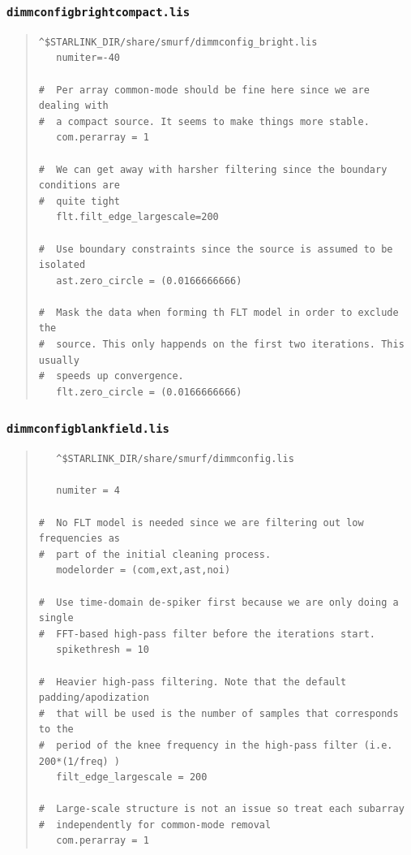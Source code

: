 \documentclass[twoside,11pt]{article}
\renewcommand{\_}{\texttt{\symbol{95}}}
\newcommand{\file}[1]{\texttt{#1}}
\begin{document}
\subsubsection{\file{dimmconfig\_bright\_compact.lis}}
\begin{quote}
\begin{verbatim}
^$STARLINK_DIR/share/smurf/dimmconfig_bright.lis
   numiter=-40

#  Per array common-mode should be fine here since we are dealing with
#  a compact source. It seems to make things more stable.
   com.perarray = 1

#  We can get away with harsher filtering since the boundary conditions are
#  quite tight
   flt.filt_edge_largescale=200

#  Use boundary constraints since the source is assumed to be isolated
   ast.zero_circle = (0.0166666666)

#  Mask the data when forming th FLT model in order to exclude the
#  source. This only happends on the first two iterations. This usually
#  speeds up convergence.
   flt.zero_circle = (0.0166666666)

\end{verbatim}
\end{quote}

\subsubsection{\file{dimmconfig\_blank\_field.lis}}
\begin{quote}
\begin{verbatim}
   ^$STARLINK_DIR/share/smurf/dimmconfig.lis

   numiter = 4

#  No FLT model is needed since we are filtering out low frequencies as
#  part of the initial cleaning process.
   modelorder = (com,ext,ast,noi)

#  Use time-domain de-spiker first because we are only doing a single
#  FFT-based high-pass filter before the iterations start.
   spikethresh = 10

#  Heavier high-pass filtering. Note that the default padding/apodization
#  that will be used is the number of samples that corresponds to the
#  period of the knee frequency in the high-pass filter (i.e. 200*(1/freq) )
   filt_edge_largescale = 200

#  Large-scale structure is not an issue so treat each subarray
#  independently for common-mode removal
   com.perarray = 1

\end{verbatim}
\end{quote}
\end{document}
